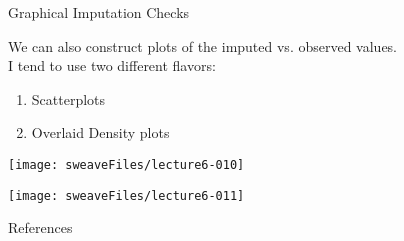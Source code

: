 \documentclass{beamer}
\begin{document}
\begin{frame}[allowframebreaks]{Graphical Imputation Checks}
    
  We can also construct plots of the imputed vs. observed values.\\
  \vspace{12pt}
  I tend to use two different flavors:
  \begin{enumerate}
    \item Scatterplots
    \item Overlaid Density plots
  \end{enumerate}
  

\texttt{[image: sweaveFiles/lecture6-010]}


\texttt{[image: sweaveFiles/lecture6-011]}

\end{frame}



\begin{frame}{References}


\end{frame}
\end{document}
